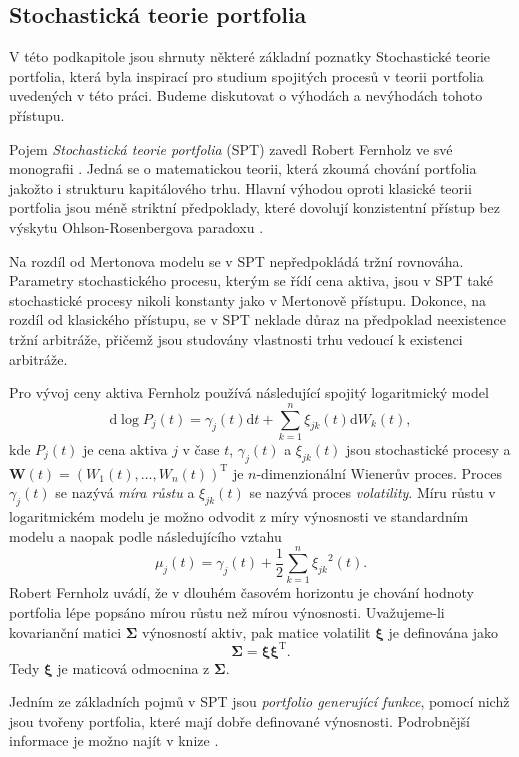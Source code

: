 \documentclass[a4paper,12pt]{report}
\theoremstyle{definition} \newtheorem{definice}[veta]{Definice}
\theoremstyle{remark}
\begin{document}

\subsection{Stochastická teorie portfolia}
V této podkapitole jsou shrnuty některé základní poznatky Stochastické teorie portfolia, která byla inspirací pro studium spojitých procesů v teorii portfolia uvedených v této práci.
Budeme diskutovat o výhodách a nevýhodách tohoto přístupu.

Pojem \textit{Stochastická teorie portfolia} (SPT) zavedl Robert Fernholz ve své monografii \cite{fern}.
Jedná se o matematickou teorii, která zkoumá chování portfolia jakožto i strukturu kapitálového trhu.
Hlavní výhodou oproti klasické teorii portfolia jsou méně  striktní předpoklady, které dovolují konzistentní přístup bez výskytu Ohlson-Rosenbergova paradoxu \cite{ohlson}.

Na rozdíl od Mertonova modelu se v SPT nepředpokládá tržní rovnováha.
Parametry stochastického procesu, kterým se řídí cena aktiva, jsou v SPT také stochastické procesy nikoli konstanty jako v Mertonově přístupu.
Dokonce, na rozdíl od klasického přístupu, se v SPT neklade důraz na předpoklad neexistence tržní arbitráže, přičemž jsou studovány vlastnosti trhu vedoucí k existenci arbitráže. 

Pro vývoj ceny aktiva Fernholz používá následující spojitý logaritmický model
$$\mathrm{d}\log P_j(t)=\gamma_j(t)\mathrm{d}t+\sum_{k=1}^{n}\xi_{jk}(t)\mathrm{d}W_k(t),$$
kde $P_j(t)$ je cena aktiva $j$ v čase $t$, $\gamma_j(t)$ a $\xi_{jk}(t)$ jsou stochastické procesy a $\boldsymbol{W}(t)=(W_1(t),\dots,W_n(t))^\mathrm{T}$ je $n$-dimenzionální Wienerův proces. 
Proces $\gamma_j(t)$ se nazývá \textit{míra růstu} a $\xi_{jk}(t)$ se nazývá proces \textit{volatility}.
Míru růstu v logaritmickém modelu je možno odvodit z míry výnosnosti ve standardním modelu a naopak podle následujícího vztahu
$$\mu_j(t)=\gamma_j(t)+\frac12\sum_{k=1}^{n}{\xi_{jk}}^2(t).$$
Robert Fernholz uvádí, že v dlouhém časovém horizontu je chování hodnoty portfolia lépe popsáno mírou růstu než mírou výnosnosti.
Uvažujeme-li kovarianční matici $\boldsymbol{\Sigma}$ výnosností aktiv, pak matice volatilit $\boldsymbol{\xi}$ je definována jako
$$\boldsymbol{\Sigma}=\boldsymbol{\xi}\boldsymbol{\xi}^\mathrm{T}.$$
Tedy $\boldsymbol{\xi}$ je maticová odmocnina z $\boldsymbol{\Sigma}$.

Jedním ze základních pojmů v SPT jsou \textit{portfolio generující funkce}, pomocí nichž jsou tvořeny portfolia, které mají dobře definované výnosnosti. Podrobnější informace je možno najít v knize \cite{fern}.
\end{document}
